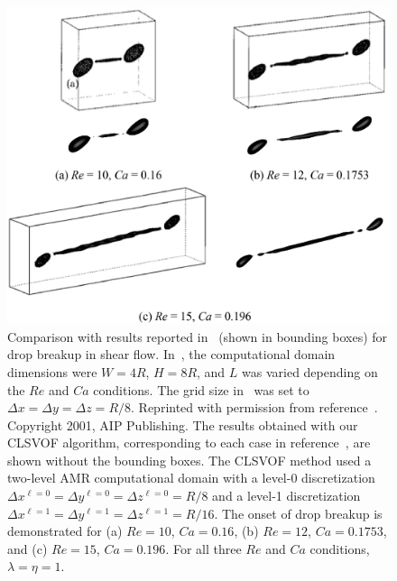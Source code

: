 \documentclass{elsarticle}
\begin{document}
\begin{figure}[h!]
  \centering
  \includegraphics[scale=0.5]{Figure/2-DropBreakComparison}
  \caption{Comparison with results reported in~\citet{RenCri01-2} (shown in bounding boxes) for drop breakup in shear flow.  In~\citet{RenCri01-2}, the computational domain dimensions were $W=4R$, $H=8R$, and $L$ was varied depending on the $Re$ and $Ca$ conditions.  The grid size in~\citet{RenCri01-2} was set to $\Delta x=\Delta y=\Delta z=R/8$.  Reprinted with permission from reference~\citet{RenCri01-2}.  Copyright 2001, AIP Publishing.  The results obtained with our CLSVOF algorithm, corresponding to each case in reference~\citet{RenCri01-2}, are shown without the bounding boxes.  The CLSVOF method used a two-level AMR computational domain with a level-0 discretization $\Delta x^{\ell=0} = \Delta y^{\ell=0} = \Delta z^{\ell=0} = R/8$ and a level-1 discretization $\Delta x^{\ell=1} = \Delta y^{\ell=1} = \Delta z^{\ell=1} = R/16$.  The onset of drop breakup is demonstrated for (a) $Re=10$, $Ca=0.16$, (b) $Re=12$, $Ca=0.1753$, and (c) $Re=15$, $Ca=0.196$.  For all three $Re$ and $Ca$ conditions, $\lambda = \eta = 1$.}
  \label{fig:DropBreakComp}
\end{figure}
%
\end{document}
